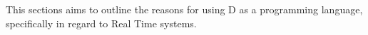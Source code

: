 This sections aims to outline the reasons for using D as a programming language,
specifically in regard to Real Time systems. 
